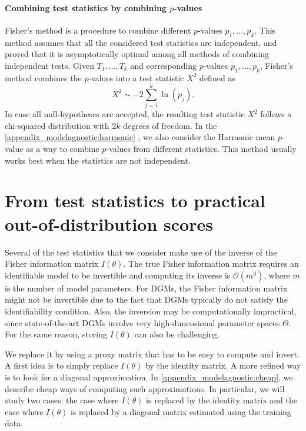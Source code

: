 {\paragraph{Combining test statistics by combining $p$-values}
Fisher's \citeyearpar{fisher_statistical_1925} method is a procedure to combine different $p$-values $p_1,\dots, p_k$. This method assumes that all the considered test statistics are independent, and \textcite{folks_asymptotic_1971} proved that it is asymptotically optimal among all methods of combining independent tests.
%
Given $T_1,\dots, T_k$ and corresponding $p$-values $p_1,\dots, p_k$, Fisher's method combines the $p$-values into a test statistic $X^2$ defined as
\begin{equation}
    \label{eq_modelagnostic:Fisher_method}
    X^2 \sim -2 \sum_{j=1}^{k} \ln (p_j).
\end{equation}
In case all null-hypotheses are accepted, the resulting test statistic $X^2$ follows a chi-squared distribution with $2k$ degrees of freedom. 
%
In the \cref{appendix_modelagnostic:harmonic} , we also consider the Harmonic mean $p$-value \parencite{wilson_harmonic_2019} as a way to combine $p$-values from different statistics. This method usually works best when the statistics are not independent.

\section{From test statistics to practical out-of-distribution scores}
\label{sec_modelagnostic:section4}

Several of the test statistics that we consider make use of the inverse of the Fisher information matrix $I(\theta)$. The true Fisher information matrix requires an identifiable model to be invertible \parencite{watanabe_algebraic_2009} and computing its inverse is $\mathcal{O}(m^3)$, where $m$ is the number of model parameters. For DGMs, the Fisher information matrix might not be invertible due to the fact that DGMs typically do not satisfy the identifiability condition. Also, the inversion may be computationally impractical, since state-of-the-art DGMs involve very high-dimensional parameter spaces $\Theta$. For the same reason, storing $I(\theta)$ can also be challenging.

We replace it by using a proxy matrix that has to be easy to compute and invert. A first idea is to simply replace $I(\theta)$ by the identity matrix. A more refined way is to look for a diagonal approximation. In \cref{appendix_modelagnostic:cheap}, we describe cheap ways of computing such approximations. In particular, we will study two cases: the case where $I(\theta)$ is replaced by the identity matrix and the case where $I(\theta)$ is replaced by a diagonal matrix estimated using the training data.

}

